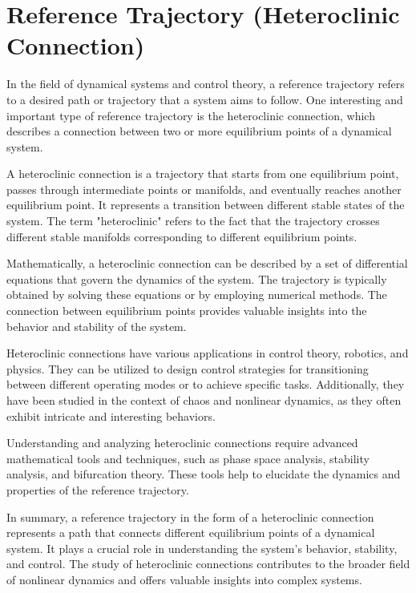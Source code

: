 \documentclass{article}
\begin{document}
\section{Reference Trajectory (Heteroclinic Connection)}

In the field of dynamical systems and control theory, a reference trajectory refers to a desired path or trajectory that a system aims to follow. One interesting and important type of reference trajectory is the heteroclinic connection, which describes a connection between two or more equilibrium points of a dynamical system.

A heteroclinic connection is a trajectory that starts from one equilibrium point, passes through intermediate points or manifolds, and eventually reaches another equilibrium point. It represents a transition between different stable states of the system. The term "heteroclinic" refers to the fact that the trajectory crosses different stable manifolds corresponding to different equilibrium points.

Mathematically, a heteroclinic connection can be described by a set of differential equations that govern the dynamics of the system. The trajectory is typically obtained by solving these equations or by employing numerical methods. The connection between equilibrium points provides valuable insights into the behavior and stability of the system.

Heteroclinic connections have various applications in control theory, robotics, and physics. They can be utilized to design control strategies for transitioning between different operating modes or to achieve specific tasks. Additionally, they have been studied in the context of chaos and nonlinear dynamics, as they often exhibit intricate and interesting behaviors.

Understanding and analyzing heteroclinic connections require advanced mathematical tools and techniques, such as phase space analysis, stability analysis, and bifurcation theory. These tools help to elucidate the dynamics and properties of the reference trajectory.

In summary, a reference trajectory in the form of a heteroclinic connection represents a path that connects different equilibrium points of a dynamical system. It plays a crucial role in understanding the system's behavior, stability, and control. The study of heteroclinic connections contributes to the broader field of nonlinear dynamics and offers valuable insights into complex systems.
\end{document}
